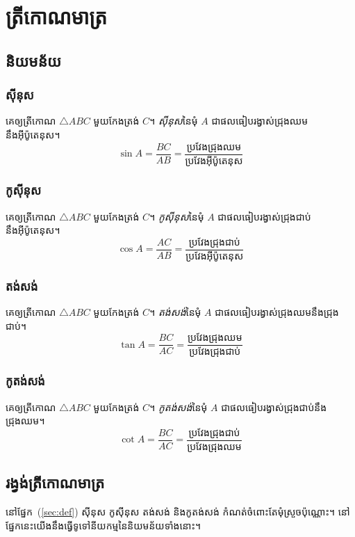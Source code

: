 \documentclass[12pt]{book}
\begin{document}
	\chapter{ត្រីកោណមាត្រ}
	\section{និយមន័យ\label{sec:def}}
	\subsection{ស៊ីនុស}
	\begin{definition}[ស៊ីនុស]
		គេឲ្យត្រីកោណ $ \triangle ABC $ មួយកែងត្រង់ $ C $។ \emph{ស៊ីនុស}នៃមុំ $ A $ ជាផលធៀបរង្វាស់ជ្រុងឈមនឹងអ៊ីប៉ូតេនុស។
		\[ \sin A=\frac{BC}{AB}=\frac{\text{ប្រវែងជ្រុងឈម}}{\text{ប្រវែងអ៊ីប៉ូតេនុស}} \]
	\end{definition}
	\subsection{កូស៊ីនុស}
	\begin{definition}[កូស៊ីនុស]
		គេឲ្យត្រីកោណ $ \triangle ABC $ មួយកែងត្រង់ $ C $។ \emph{កូស៊ីនុស}នៃមុំ $ A $ ជាផលធៀបរង្វាស់ជ្រុងជាប់នឹងអ៊ីប៉ូតេនុស។
		\[ \cos A=\frac{AC}{AB}=\frac{\text{ប្រវែងជ្រុងជាប់}}{\text{ប្រវែងអ៊ីប៉ូតេនុស}} \]
	\end{definition}
	\subsection{តង់សង់}
	\begin{definition}[តង់សង់]
		គេឲ្យត្រីកោណ $ \triangle ABC $ មួយកែងត្រង់ $ C $។ \emph{តង់សង់}នៃមុំ $ A $ ជាផលធៀបរង្វាស់ជ្រុងឈមនឹងជ្រុងជាប់។
		\[ \tan A=\frac{BC}{AC}=\frac{\text{ប្រវែងជ្រុងឈម}}{\text{ប្រវែងជ្រុងជាប់}} \]
	\end{definition}
	\subsection{កូតង់សង់}
	\begin{definition}[កូតង់សង់]
		គេឲ្យត្រីកោណ $ \triangle ABC $ មួយកែងត្រង់ $ C $។ \emph{កូតង់សង់}នៃមុំ $ A $ ជាផលធៀបរង្វាស់ជ្រុងជាប់នឹងជ្រុងឈម។
		\[ \cot A=\frac{BC}{AC}=\frac{\text{ប្រវែងជ្រុងជាប់}}{\text{ប្រវែងជ្រុងឈម}} \]
	\end{definition}
	\section{រង្វង់ត្រីកោណមាត្រ}
	នៅផ្នែក~(\ref{sec:def}) ស៊ីនុស កូស៊ីនុស តង់សង់ និងកូតង់សង់ កំណត់ចំពោះតែមុំស្រួចប៉ុណ្ណោះ។ នៅផ្នែកនេះយើងនឹងធ្វើទូទៅនីយកម្មនៃនិយមន័យទាំងនោះ។
\end{document}
